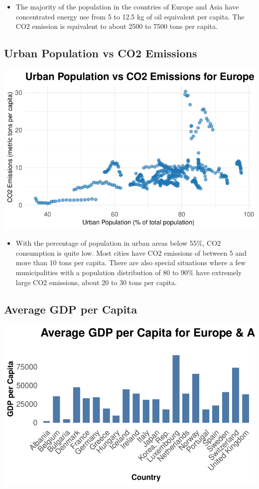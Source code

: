 \documentclass[
  11pt,
]{article}
\providecommand{\tightlist}{%
  \setlength{\itemsep}{0pt}\setlength{\parskip}{0pt}}\usepackage{longtable,booktabs,array}
\begin{document}
\begin{itemize}
\tightlist
\item
  The majority of the population in the countries of Europe and Asia
  have concentrated energy use from 5 to 12.5 kg of oil equivalent per
  capita. The CO2 emission is equivalent to about 2500 to 7500 tons per
  capita.
\end{itemize}

\subsection{Urban Population vs CO2 Emissions}

\includegraphics{Report_files/figure-pdf/unnamed-chunk-22-1.pdf}

\begin{itemize}
\tightlist
\item
  With the percentage of population in urban areas below 55\%, CO2
  consumption is quite low. Most cities have CO2 emissions of between 5
  and more than 10 tons per capita. There are also special situations
  where a few municipalities with a population distribution of 80 to
  90\% have extremely large CO2 emissions, about 20 to 30 tons per
  capita.
\end{itemize}

\subsection{Average GDP per Capita}

\includegraphics{Report_files/figure-pdf/unnamed-chunk-23-1.pdf}
\end{document}
